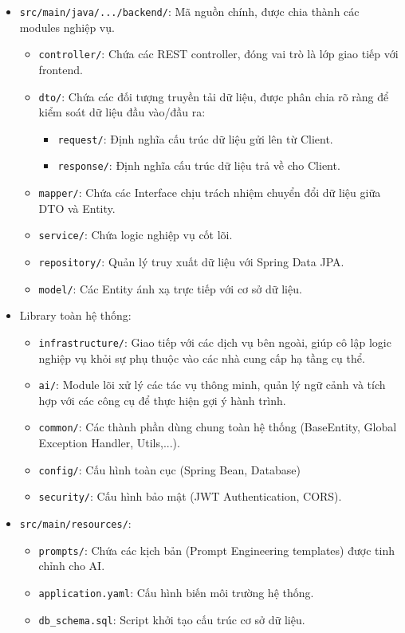 \begin{itemize}
    \item \texttt{src/main/java/.../backend/}: Mã nguồn chính, được chia thành các modules nghiệp vụ.
    \begin{itemize}
        \item \texttt{controller/}: Chứa các REST controller, đóng vai trò là lớp giao tiếp với frontend.
        \item \texttt{dto/}: Chứa các đối tượng truyền tải dữ liệu, được phân chia rõ ràng để kiểm soát dữ liệu đầu vào/đầu ra:
        \begin{itemize}
            \item \texttt{request/}: Định nghĩa cấu trúc dữ liệu gửi lên từ Client.
            \item \texttt{response/}: Định nghĩa cấu trúc dữ liệu trả về cho Client.
        \end{itemize}
        \item \texttt{mapper/}: Chứa các Interface chịu trách nhiệm chuyển đổi dữ liệu giữa DTO và Entity. 
        \item \texttt{service/}: Chứa logic nghiệp vụ cốt lõi.
        \item \texttt{repository/}: Quản lý truy xuất dữ liệu với Spring Data JPA.
        \item \texttt{model/}: Các Entity ánh xạ trực tiếp với cơ sở dữ liệu.
    \end{itemize}
    \item Library toàn hệ thống:
    \begin{itemize}
        \item \texttt{infrastructure/}: Giao tiếp với các dịch vụ bên ngoài, giúp cô lập logic nghiệp vụ khỏi sự phụ thuộc vào các nhà cung cấp hạ tầng cụ thể.
        \item \texttt{ai/}: Module lõi xử lý các tác vụ thông minh, quản lý ngữ cảnh và tích hợp với các công cụ để thực hiện gợi ý hành trình.
        \item \texttt{common/}: Các thành phần dùng chung toàn hệ thống (BaseEntity, Global Exception Handler, Utils,...).
        \item \texttt{config/}: Cấu hình toàn cục (Spring Bean, Database) 
        \item \texttt{security/}: Cấu hình bảo mật (JWT Authentication, CORS).
    \end{itemize}
    \item \texttt{src/main/resources/}:
    \begin{itemize}
        \item \texttt{prompts/}: Chứa các kịch bản (Prompt Engineering templates) được tinh chỉnh cho AI.
        \item \texttt{application.yaml}: Cấu hình biến môi trường hệ thống.
        \item \texttt{db\_schema.sql}: Script khởi tạo cấu trúc cơ sở dữ liệu.
    \end{itemize}
\end{itemize}
